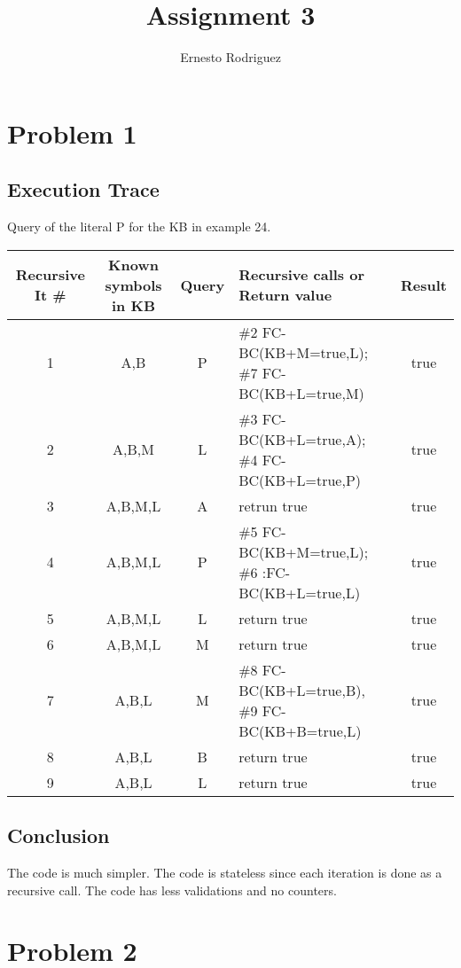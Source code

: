 \documentclass{article}
\title{Assignment 3}
\author{Ernesto Rodriguez}
\begin{document}
\maketitle

\section{Problem 1}
\subsection{Execution Trace}

Query of the literal P for the KB in example 24.

\begin{tabular}{ | c | c | c | p{40mm} | c | }
\hline
{\bf Recursive It \#} & {\bf Known symbols in KB} & {\bf Query} & {\bf Recursive calls or Return value} & {\bf Result}\\
\hline
1 & A,B & P & \#2 FC-BC(KB+{M=true},L); \#7 FC-BC(KB+{L=true},M) & true\\
\hline
2 & A,B,M & L & \#3 FC-BC(KB+{L=true},A); \#4 FC-BC(KB+{L=true},P) & true\\
\hline
3 & A,B,M,L & A & retrun true & true\\
\hline
4 & A,B,M,L & P & \#5 FC-BC(KB+{M=true},L); \#6 :FC-BC(KB+{L=true},L) & true\\
\hline
5 & A,B,M,L & L & return true & true\\
\hline
6 & A,B,M,L & M & return true & true\\
\hline
7 & A,B,L & M & \#8 FC-BC(KB+{L=true},B), \#9 FC-BC(KB+{B=true},L) & true\\
\hline
8 & A,B,L & B & return true & true \\
\hline
9 & A,B,L & L & return true & true \\
\hline
\end{tabular}

\subsection{Conclusion}

The code is much simpler. The code is stateless since each iteration is done as a recursive call. The code has less validations and no counters.

\section{Problem 2}
\end{document}
